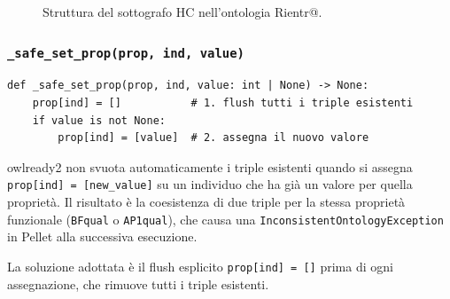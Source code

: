 \documentclass[a4paper,12pt]{article}
\begin{document}
\begin{figure}[htbp]
\centering
{}%
\caption{Struttura del sottografo HC nell'ontologia Rientr@.}
\end{figure}

\subsubsection{\texttt{\_\allowbreak{}safe\_\allowbreak{}set\_\allowbreak{}prop(prop, ind, value)}}

\begin{lstlisting}[caption={Assegnazione sicura di propriet\`{a} funzionali in owlready2.}]
def _safe_set_prop(prop, ind, value: int | None) -> None:
    prop[ind] = []           # 1. flush tutti i triple esistenti
    if value is not None:
        prop[ind] = [value]  # 2. assegna il nuovo valore
\end{lstlisting}

\noindent \begin{warningbox}
owlready2 non svuota automaticamente i triple esistenti quando si
assegna \texttt{prop[ind] = [new\_value]} su un individuo che ha gi\`{a}
un valore per quella propriet\`{a}. Il risultato \`{e} la coesistenza di
due triple per la stessa propriet\`{a} funzionale (\texttt{BFqual} o
\texttt{AP1qual}), che causa una \texttt{InconsistentOntologyException}
in Pellet alla successiva esecuzione.

La soluzione adottata \`{e} il flush esplicito \texttt{prop[ind] = []}
prima di ogni assegnazione, che rimuove tutti i triple esistenti.
\end{warningbox}
\end{document}
